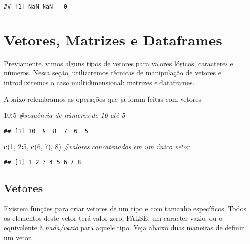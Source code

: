 \documentclass[
]{book}
\newenvironment{Shaded}{\begin{snugshade}}{\end{snugshade}}
\newcommand{\CommentTok}[1]{\textcolor[rgb]{0.56,0.35,0.01}{\textit{#1}}}
\newcommand{\DecValTok}[1]{\textcolor[rgb]{0.00,0.00,0.81}{#1}}
\newcommand{\FunctionTok}[1]{\textcolor[rgb]{0.13,0.29,0.53}{\textbf{#1}}}
\newcommand{\NormalTok}[1]{#1}
\newcommand{\SpecialCharTok}[1]{\textcolor[rgb]{0.81,0.36,0.00}{\textbf{#1}}}
\begin{document}
\begin{verbatim}
## [1] NaN NaN   0
\end{verbatim}

\section{Vetores, Matrizes e Dataframes}\label{vetores-matrizes-e-dataframes}

Previamente, vimos alguns tipos de vetores para valores lógicos, caracteres e números.
Nessa seção, utilizaremos técnicas de manipulação de vetores e introduziremos o caso multidimensional: matrizes e dataframes.

Abaixo relembramos as operações que já foram feitas com vetores

\begin{Shaded}
\begin{Highlighting}[]
\DecValTok{10}\SpecialCharTok{:}\DecValTok{5}                    \CommentTok{\#sequência de números de 10 até 5}
\end{Highlighting}
\end{Shaded}

\begin{verbatim}
## [1] 10  9  8  7  6  5
\end{verbatim}

\begin{Shaded}
\begin{Highlighting}[]
\FunctionTok{c}\NormalTok{(}\DecValTok{1}\NormalTok{, }\DecValTok{2}\SpecialCharTok{:}\DecValTok{5}\NormalTok{, }\FunctionTok{c}\NormalTok{(}\DecValTok{6}\NormalTok{, }\DecValTok{7}\NormalTok{), }\DecValTok{8}\NormalTok{)   }\CommentTok{\#valores concatenados em um único vetor}
\end{Highlighting}
\end{Shaded}

\begin{verbatim}
## [1] 1 2 3 4 5 6 7 8
\end{verbatim}

\subsection{Vetores}\label{vetores}

Existem funções para criar vetores de um tipo e com tamanho específicos.
Todos os elementos deste vetor terá valor zero, FALSE, um caracter vazio, ou o equivalente à \emph{nada/vazio} para aquele tipo.
Veja abaixo duas maneiras de definir um vetor.
\end{document}

